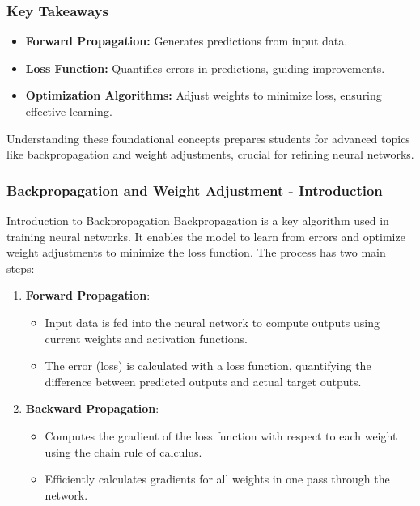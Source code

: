 \documentclass[aspectratio=169]{beamer}
\begin{document}
\begin{frame}[fragile]
    \frametitle{Key Takeaways}
    \begin{itemize}
        \item \textbf{Forward Propagation:} Generates predictions from input data.
        \item \textbf{Loss Function:} Quantifies errors in predictions, guiding improvements.
        \item \textbf{Optimization Algorithms:} Adjust weights to minimize loss, ensuring effective learning.
    \end{itemize}
    
    Understanding these foundational concepts prepares students for advanced topics like backpropagation and weight adjustments, crucial for refining neural networks.
\end{frame}

\begin{frame}[fragile]
    \frametitle{Backpropagation and Weight Adjustment - Introduction}
    \begin{block}{Introduction to Backpropagation}
        Backpropagation is a key algorithm used in training neural networks. It enables the model to learn from errors and optimize weight adjustments to minimize the loss function. The process has two main steps:
    \end{block}
    \begin{enumerate}
        \item \textbf{Forward Propagation}: 
        \begin{itemize}
            \item Input data is fed into the neural network to compute outputs using current weights and activation functions.
            \item The error (loss) is calculated with a loss function, quantifying the difference between predicted outputs and actual target outputs.
        \end{itemize}
        \item \textbf{Backward Propagation}: 
        \begin{itemize}
            \item Computes the gradient of the loss function with respect to each weight using the chain rule of calculus.
            \item Efficiently calculates gradients for all weights in one pass through the network.
        \end{itemize}
    \end{enumerate}
\end{frame}
\end{document}
